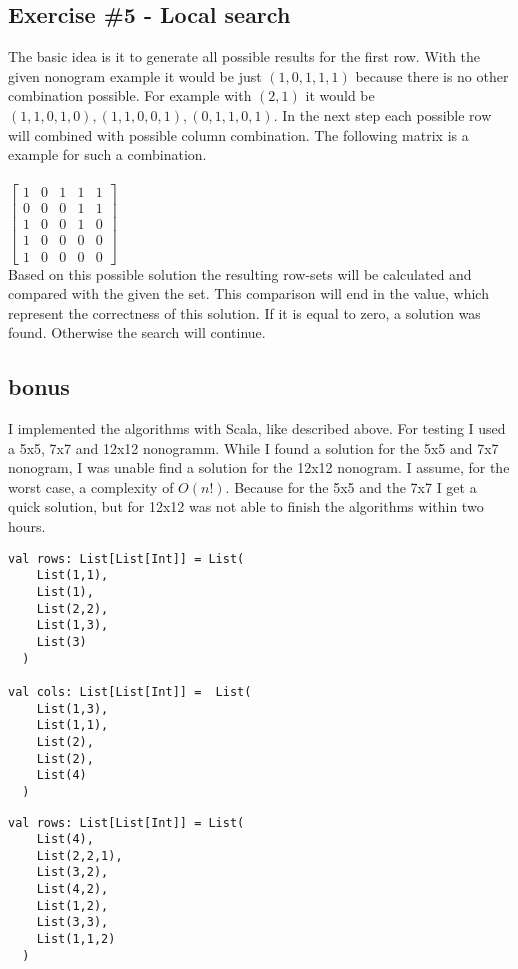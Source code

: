 \documentclass{article}
\begin{document}
\begin{spacing}{1.2}
\section{Exercise \#5 - Local search}
The basic idea is it to generate all possible results for the first row. With the given nonogram example it would be just {$(1,0,1,1,1)$} because there is no other combination possible. For example with {$(2,1)$} it would be {$(1,1,0,1,0),(1,1,0,0,1),(0,1,1,0,1)$}. In the next step each possible row will combined with possible column combination. The following matrix is a example for such a combination. \\\\
$\begin{bmatrix}
    1 & 0 & 1 & 1 & 1\\
    0 & 0 & 0 & 1 & 1\\
    1 & 0 & 0 & 1 & 0\\
    1 & 0 & 0 & 0 & 0\\
    1 & 0 & 0 & 0 & 0
\end{bmatrix}$\\

Based on this possible solution the resulting row-sets will be calculated and compared with the given the set. This comparison will end in the value, which represent the correctness of this solution. If it is equal to zero, a solution was found. Otherwise the search will continue.  

\subsection{bonus}
I implemented the algorithms with Scala, like described above. For testing I used a 5x5, 7x7 and 12x12 nonogramm. While I found a solution for the 5x5 and 7x7 nonogram, I was unable find a solution for the 12x12 nonogram. I assume, for the worst case, a complexity of $O(n!)$. Because for the 5x5 and the 7x7 I get a quick solution, but for 12x12 was not able to finish the algorithms within two hours.
\newpage

\begin{lstlisting}
val rows: List[List[Int]] = List(
    List(1,1),
    List(1),
    List(2,2),
    List(1,3),
    List(3)
  )

val cols: List[List[Int]] =  List(
    List(1,3),
    List(1,1),
    List(2),
    List(2),
    List(4)
  )
\end{lstlisting}

\begin{lstlisting}
val rows: List[List[Int]] = List(
    List(4),
    List(2,2,1),
    List(3,2),
    List(4,2),
    List(1,2),
    List(3,3),
    List(1,1,2)
  )


\end{lstlisting}
\end{spacing}
\end{document}
